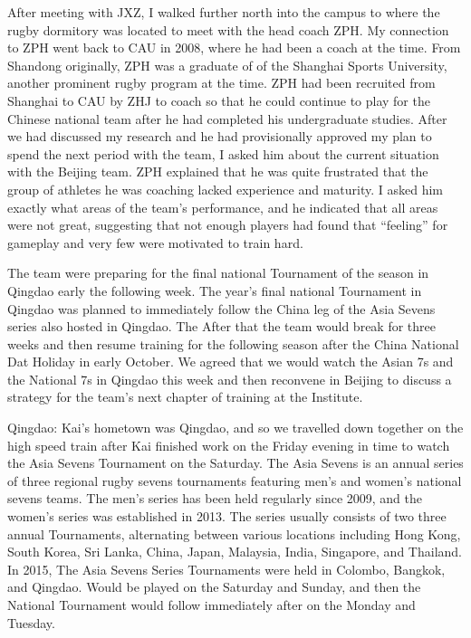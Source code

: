 
After meeting with JXZ, I walked further north into the campus to where the rugby dormitory was located to meet with the head coach ZPH. My connection to ZPH went back to CAU in 2008, where he had been a coach at the time. From Shandong originally, ZPH was a graduate of of the Shanghai Sports University, another prominent rugby program at the time.  ZPH had been recruited from Shanghai to CAU by ZHJ to coach so that he could continue to play for the Chinese national team after he had completed his undergraduate studies.  After we had discussed my research and he had provisionally approved my plan to spend the next period with the team, I asked him about the current situation with the Beijing team.  ZPH explained that he was quite frustrated that the group of athletes he was coaching lacked experience and maturity. I asked him exactly what areas of the team's performance, and he indicated that all areas were not great, suggesting that not enough players had found that ``feeling'' for gameplay and very few were motivated to train hard.

The team were preparing for the final national Tournament of the season in Qingdao early the following week. The year's final national Tournament in Qingdao was planned to immediately follow the China leg of the Asia Sevens series also hosted in Qingdao. The After that the team would break for three weeks and then resume training for the following season after the China National Dat Holiday in early October.  We agreed that we would watch the Asian 7s and the National 7s in Qingdao this week and then reconvene in Beijing to discuss a strategy for the team's next chapter of training at the Institute.



Qingdao:
Kai's hometown was Qingdao, and so we travelled down together on the high speed train after Kai finished work on the Friday evening in time to watch the Asia Sevens Tournament on the Saturday.  The Asia Sevens is an annual series of three regional rugby sevens tournaments featuring men's and women's national sevens teams.  The men's series has been held regularly since 2009, and the women's series was established in 2013. The series usually consists of two three annual Tournaments, alternating between various locations including Hong Kong, South Korea, Sri Lanka, China, Japan, Malaysia, India, Singapore, and Thailand.  In 2015, The Asia Sevens Series Tournaments were held in Colombo, Bangkok, and Qingdao. Would be played on the Saturday and Sunday, and then the National Tournament would follow immediately after on the Monday and Tuesday.



